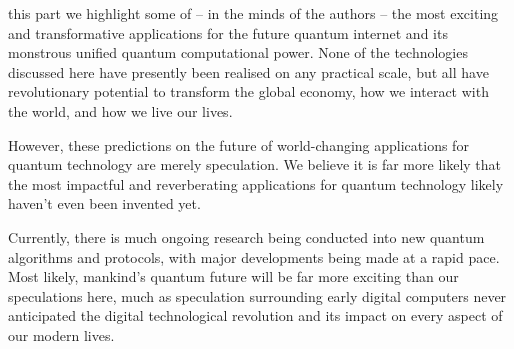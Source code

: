 %
%

\newline

 this part we highlight some of -- in the minds of the authors -- the most exciting and transformative applications for the future quantum internet and its monstrous unified quantum computational power. None of the technologies discussed here have presently been realised on any practical scale, but all have revolutionary potential to transform the global economy, how we interact with the world, and how we live our lives.

However, these predictions on the future of world-changing applications for quantum technology are merely speculation. We believe it is far more likely that the most impactful and reverberating applications for quantum technology likely haven't even been invented yet.

Currently, there is much ongoing research being conducted into new quantum algorithms and protocols, with major developments being made at a rapid pace. Most likely, mankind's quantum future will be far more exciting than our speculations here, much as speculation surrounding early digital computers never anticipated the digital technological revolution and its impact on every aspect of our modern lives.